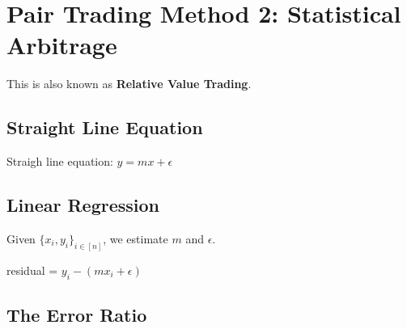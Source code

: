 \documentclass{article}
\begin{document}
\section{Pair Trading Method 2: Statistical Arbitrage}
This is also known as \textbf{Relative Value Trading}.
\subsection{Straight Line Equation}
Straigh line equation: $y = mx + \epsilon$
\subsection{Linear Regression}
Given $\{x_i,y_i\}_{i\in[n]}$, we estimate $m$ and $\epsilon$.\\
\begin{center}
    residual = $y_i - (mx_i + \epsilon)$
\end{center}
\subsection{The Error Ratio}
\end{document}
